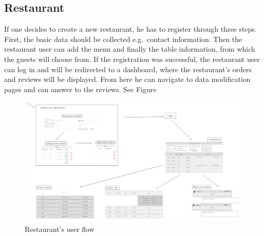 \subsection{Restaurant}\label{RestaurantUserflow}
If one decides to create a new restaurant, he has to register through three steps. First, the basic data should be collected e.g.\ contact information. Then the restaurant user can add the menu and finally the table information, from which the guests will choose from. If the registration was successful, the restaurant user can log in and will be redirected to a dashboard, where the restaurant's orders and reviews will be displayed. From here he can navigate to data modification pages and can answer to the reviews. See Figure 
\begin{figure}[!ht]
	\centering
	\includegraphics[width=150mm, keepaspectratio]{figures/UIsRestaurant.png}
	\caption{Restaurant's user flow} 
	\label{fig:UIsRestaurant}
\end{figure}